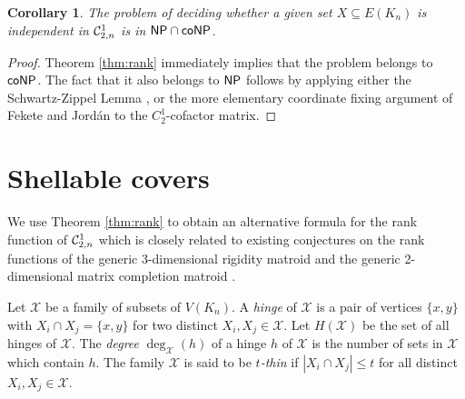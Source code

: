 \documentclass{daj}
\newtheorem{corollary}[thm]{Corollary}\theoremstyle{plain}
\newcommand{\MX}{{\mathcal X}}
\begin{document}
\begin{corollary}\label{cor:good_char}
The problem of deciding whether a given set $X\subseteq E(K_n)$  is independent  in  
${\cal C}_{2,n}^1$ is in ${\sf NP}\cap {\sf coNP}$.
\end{corollary}
\begin{proof} Theorem \ref{thm:rank} immediately implies that the problem belongs to  ${\sf coNP}$. The fact that it also belongs to ${\sf NP}$ follows by applying either the Schwartz-Zippel Lemma \cite{S80, Z79}, or the more elementary coordinate fixing argument of Fekete and Jord\'an \cite{FJ} to the $C_2^1$-cofactor matrix.
\end{proof}

\section{Shellable covers}\label{sec:shell}

We use Theorem \ref{thm:rank} to obtain an alternative formula for the rank function of 
${\cal C}_{2,n}^1$ which is closely related to existing conjectures on the rank functions of the generic 3-dimensional rigidity matroid  \cite{DDH83,JJ06,JDIMACS} and the generic 2-dimensional matrix completion matroid \cite{JJT14}.



Let
$\MX$ be a family of subsets of $V(K_n)$.
%
A {\em hinge} of $\MX$ is
 a pair of vertices $\{x,y\}$
with  $X_i\cap X_j=\{x,y\}$ for two distinct  $X_i,X_j\in \MX$. Let $H(\MX)$ be the set of all hinges of $\MX$. 
The {\em degree} $\deg_\MX(h)$ of a hinge $h$ of $\MX$
 is the number of sets in $\MX$ which contain $h$. 
 The family $\MX$ is said to be {\em $t$-thin} if $|X_i\cap X_j|\leq t$ for all distinct $X_i,X_j\in \MX$.
\end{document}
